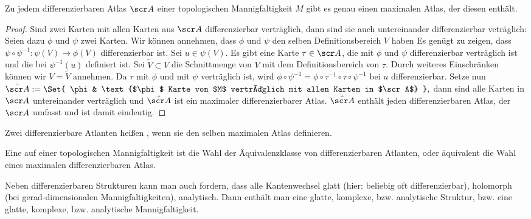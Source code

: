 \begin{st} \label{1.7}
    Zu jedem differenzierbaren Atlas $\scr A$ einer topologischen Mannigfaltigkeit $M$ gibt es genau einen maximalen Atlas, der diesen enthält.
    \begin{proof}
        Sind zwei Karten mit allen Karten aus $\scr A$ differenzierbar verträglich, dann sind sie auch untereinander differenzierbar veträglich:
        Seien dazu $\phi$ und $\psi$ zwei Karten.
        Wir können annehmen, dass $\phi$ und $\psi$ den selben Definitionsbereich $V$ haben
        Es genügt zu zeigen, dass
        \begin{math}
            \psi \circ \psi^{-1}: \psi(V) \to \phi(V)
        \end{math}
        differenzierbar ist.
        Sei $u \in \psi(V)$.
        Es gibt eine Karte $\tau \in \scr A$, die mit $\phi$ und $\psi$ differenzierbar verträglich ist und die bei $\psi^{-1}(u)$ definiert ist.
        Sei $\tilde V \subset V$ die Schnittmenge von $V$ mit dem Definitionsbereich von $\tau$.
        Durch weiteres Einschränken können wir $V = \tilde V$ annehmen.
        Da $\tau$ mit $\phi$ und mit $\psi$ verträglich ist, wird
        \begin{math}
            \phi \circ \psi^{-1} = \phi \circ \tau^{-1} \circ \tau \circ \psi^{-1}
        \end{math}
        bei $u$ differenzierbar.
        Setze nun
        \begin{math}
            \hat{\scr A} := \Set{ \phi & \text{$\phi$ Karte von $M$ verträglich mit allen Karten in $\scr A$} },
        \end{math}
        dann sind alle Karten in $\scr A$ untereinander verträglich und $\hat{\scr A}$ ist ein maximaler differenzierbarer Atlas.
        $\hat{\scr A}$ enthält jeden differenzierbaren Atlas, der $\scr A$ umfasst und ist damit eindeutig.
    \end{proof}
\end{st}

\begin{df*}
    Zwei differenzierbare Atlanten heißen , wenn sie den selben maximalen Atlas definieren.
\end{df*}

\begin{df} \label{1.8}
    Eine  auf einer topologischen Mannigfaltigkeit ist die Wahl der Äquivalenzklasse von differenzierbaren Atlanten, oder äquivalent die Wahl eines maximalen differenzierbaren Atlas.

    \begin{note}
        Neben differenzierbaren Strukturen kann man auch fordern, dass alle Kantenwechsel glatt (hier: beliebig oft differenzierbar), holomorph (bei gerad-dimensionalen Mannigfaltigkeiten), analytisch.
        Dann enthält man eine glatte, komplexe, bzw. analytische Struktur, bzw. eine glatte, komplexe, bzw. analytische Mannigfaltigkeit.
    \end{note}
\end{df}

